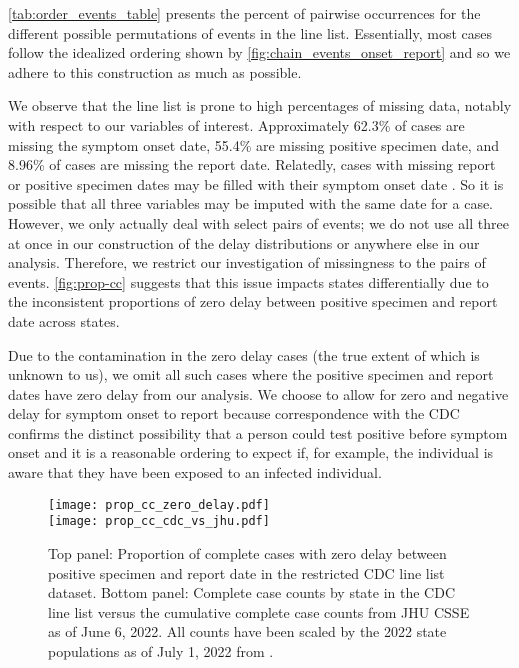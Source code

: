 \autoref{tab:order_events_table} presents the percent of pairwise occurrences
for the different possible permutations of events in the line list. Essentially,
most cases follow the idealized ordering shown by
\autoref{fig:chain_events_onset_report} and so we adhere to this construction as
much as possible.

We observe that the line list is prone to high percentages of missing data,
notably with respect to our variables of interest. Approximately 62.3\% of cases
are missing the symptom onset date, 55.4\% are missing positive specimen date,
and 8.96\% of cases are missing the report date. Relatedly,
cases with
missing report or positive specimen dates may be filled with their symptom onset date
\citep{jahja2022real}. So it is possible that all three variables may be
imputed with the same date for a case. However, we only actually deal with
select pairs of events; we do not use all three at once in our construction of
the delay distributions or anywhere else in our analysis. Therefore, we restrict
our investigation of missingness to the pairs of events.
\autoref{fig:prop-cc} suggests that this issue impacts states
differentially due to the inconsistent proportions of zero delay between
positive specimen and report date across states. 

Due to the contamination in the zero delay cases (the true extent of which is
unknown to us), we omit all such cases where the positive specimen and report
dates have zero delay from our analysis. We choose to allow for zero and
negative delay for symptom onset to report because correspondence with the CDC
confirms the distinct possibility that a person could test positive before
symptom onset and it is a reasonable ordering to expect if, for example, the
individual is aware that they have been exposed to an infected individual.

\begin{figure}[!tb]
\centering
\texttt{[image: prop\_cc\_zero\_delay.pdf]}\\
\texttt{[image: prop\_cc\_cdc\_vs\_jhu.pdf]} 
\caption{Top panel: Proportion of complete cases with zero delay between
    positive specimen and report date in the restricted CDC line list dataset.
    Bottom panel: Complete case counts by state in the CDC line list versus the
    cumulative complete case counts from JHU CSSE as of June 6, 2022. All
    counts have been scaled by the 2022 state populations as of July 1, 2022
    from \citep{uscensus2022annual}.}
\label{fig:prop-cc}
\end{figure}

